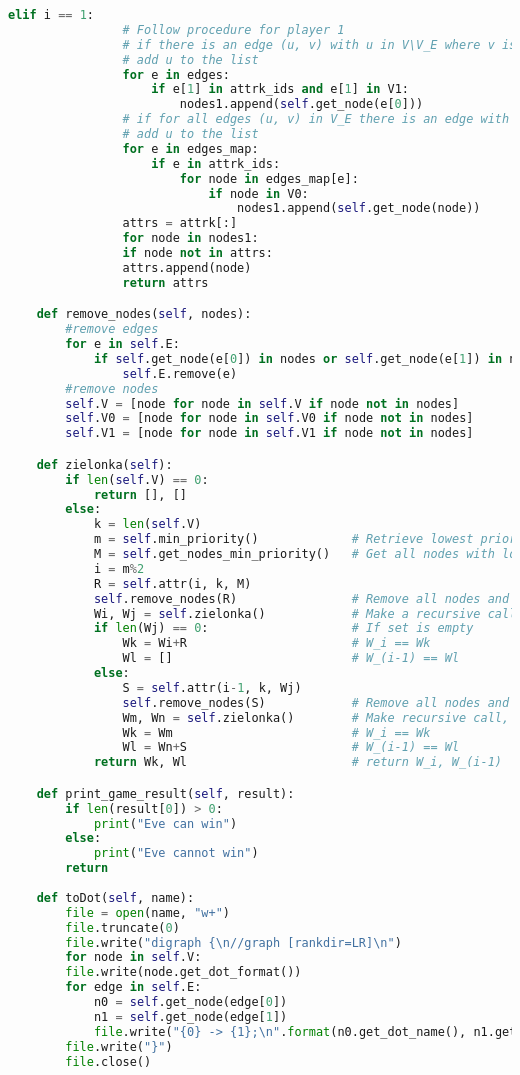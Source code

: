 \documentclass[12pt]{article}
\begin{document}
\begin{lstlisting}[language=python]
			elif i == 1:
				# Follow procedure for player 1
				# if there is an edge (u, v) with u in V\V_E where v is in attrk, 
				# add u to the list
				for e in edges:
					if e[1] in attrk_ids and e[1] in V1:
						nodes1.append(self.get_node(e[0]))
				# if for all edges (u, v) in V_E there is an edge with v in attrk, 
				# add u to the list
				for e in edges_map:
					if e in attrk_ids:
						for node in edges_map[e]:
							if node in V0:
								nodes1.append(self.get_node(node))
				attrs = attrk[:]
				for node in nodes1:
				if node not in attrs:
				attrs.append(node)
				return attrs

	def remove_nodes(self, nodes):
		#remove edges
		for e in self.E:
			if self.get_node(e[0]) in nodes or self.get_node(e[1]) in nodes:
				self.E.remove(e)
		#remove nodes
		self.V = [node for node in self.V if node not in nodes]
		self.V0 = [node for node in self.V0 if node not in nodes]
		self.V1 = [node for node in self.V1 if node not in nodes]

	def zielonka(self):
		if len(self.V) == 0:
			return [], []
		else:
			k = len(self.V)
			m = self.min_priority()             # Retrieve lowest priority
			M = self.get_nodes_min_priority()   # Get all nodes with lowest priority
			i = m%2
			R = self.attr(i, k, M)
			self.remove_nodes(R)                # Remove all nodes and related edges from the game
			Wi, Wj = self.zielonka()            # Make a recursive call, W_i' == Wi, W_(i-1)' == Wj
			if len(Wj) == 0:                    # If set is empty
				Wk = Wi+R                       # W_i == Wk
				Wl = []                         # W_(i-1) == Wl
			else:
				S = self.attr(i-1, k, Wj)
				self.remove_nodes(S)            # Remove all nodes and related edges from the game
				Wm, Wn = self.zielonka()        # Make recursive call, W_i" == Wm, W_(i-1)" == Wn
				Wk = Wm                         # W_i == Wk
				Wl = Wn+S                       # W_(i-1) == Wl
			return Wk, Wl                       # return W_i, W_(i-1)

	def print_game_result(self, result):
		if len(result[0]) > 0:
			print("Eve can win")
		else:
			print("Eve cannot win")
		return
	
	def toDot(self, name):
		file = open(name, "w+")
		file.truncate(0)
		file.write("digraph {\n//graph [rankdir=LR]\n")
		for node in self.V:
		file.write(node.get_dot_format())
		for edge in self.E:
			n0 = self.get_node(edge[0])
			n1 = self.get_node(edge[1])
			file.write("{0} -> {1};\n".format(n0.get_dot_name(), n1.get_dot_name()))
		file.write("}")
		file.close()



\end{lstlisting}
\end{document}
